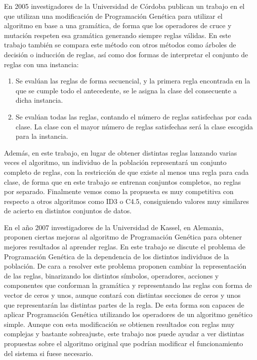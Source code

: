 En 2005 investigadores de la Universidad de Córdoba publican un trabajo \cite{grammarBasedPG} en el que utilizan una modificación de Programación Genética para utilizar el algoritmo en base a una gramática, de forma que los operadores de cruce y mutación respeten esa gramática generando siempre reglas válidas. En este trabajo también se compara este método con otros métodos como árboles de decisión o inducción de reglas, así como dos formas de interpretar el conjunto de reglas con una instancia:

\begin{enumerate}
	\item Se evalúan las reglas de forma secuencial, y la primera regla encontrada en la que se cumple todo el antecedente, se le asigna la clase del consecuente a dicha instancia.
	\item Se evalúan todas las reglas, contando el número de reglas satisfechas por cada clase. La clase con el mayor número de reglas satisfechas será la clase escogida para la instancia.
\end{enumerate}

Además, en este trabajo, en lugar de obtener distintas reglas lanzando varias veces el algoritmo, un individuo de la población representará un conjunto completo de reglas, con la restricción de que existe al menos una regla para cada clase, de forma que en este trabajo se entrenan conjuntos completos, no reglas por separado. Finalmente vemos como la propuesta es muy competitiva con respecto a otros algoritmos como ID3 o C4.5, consiguiendo valores muy similares de acierto en distintos conjuntos de datos.

En el año 2007 investigadores de la Universidad de Kassel, en Alemania, proponen \cite{mejorasPGreglas} ciertas mejoras al algoritmo de Programación Genética para obtener mejores resultados al aprender reglas. En este trabajo se discute el problema de Programación Genética de la dependencia de los distintos individuos de la población. De cara a resolver este problema proponen cambiar la representación de las reglas, binarizando los distintos símbolos, operadores, acciones y componentes que conforman la gramática y representando las reglas con forma de vector de ceros y unos, aunque contará con distintas secciones de ceros y unos que representarán las distintas partes de la regla. De esta forma son capaces de aplicar Programación Genética utilizando los operadores de un algoritmo genético simple. Aunque con esta modificación se obtienen resultados con reglas muy complejas y bastante sobreajuste, este trabajo nos puede ayudar a ver distintas propuestas sobre el algoritmo original que podrían modificar el funcionamiento del sistema si fuese necesario.

